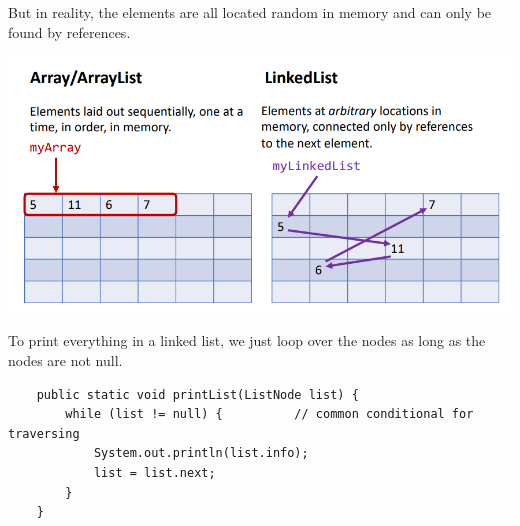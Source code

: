 \documentclass{article}
\begin{document}
\begin{definition}
    But in reality, the elements are all located random in memory and can only be found by references. 
    \begin{center}
        \includegraphics[scale=0.3]{img/linked_list_random_memory.png}
    \end{center}
    \end{definition}
    To print everything in a linked list, we just loop over the nodes as long as the nodes are not null. 
    \begin{lstlisting}
    public static void printList(ListNode list) {
        while (list != null) {          // common conditional for traversing 
            System.out.println(list.info); 
            list = list.next; 
        }
    }
    \end{lstlisting}
\end{document}
